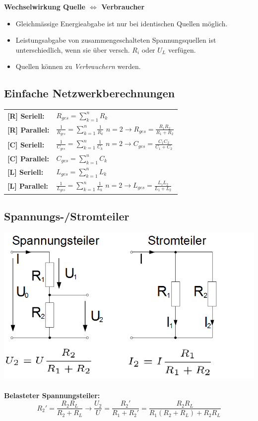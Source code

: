 \documentclass[a4paper, 11pt]{scrartcl}
\begin{document}
\begin{multicols*}{2}
				\textbf{Wechselwirkung Quelle $\Leftrightarrow$ Verbraucher}
				\begin{itemize}
					\item Gleichmässige Energieabgabe ist nur bei identischen Quellen möglich.
					\item Leistungsabgabe von zusammengeschalteten Spannungsquellen ist unterschiedlich, wenn sie über versch. $R_i$ oder $U_L$ verfügen.
					\item Quellen können zu \textit{Verbrauchern} werden.			
				\end{itemize}
				
				\subsection{Einfache Netzwerkberechnungen}
				\begin{tabular}{ll}
					\textbf{[R] Seriell:} &$R_{ges}=\sum\limits_{k=1}^{n}{R_k}$\\
					\textbf{[R] Parallel:} &$\frac{1}{R_{ges}}=\sum\limits_{k=1}^{n}{\frac{1}{R_k}}$ \quad $n=2\rightarrow R_{ges}=\frac{R_1R_2}{R_1+R_2}$\\
					\textbf{[C] Seriell:} &$\frac{1}{C_{ges}}=\sum\limits_{k=1}^{n}{\frac{1}{C_k}}$ \quad $n=2\rightarrow C_{ges}=\frac{C_1C_2}{C_1+C_2}$\\
					\textbf{[C] Parallel:} &$C_{ges}=\sum\limits_{k=1}^{n}{C_k}$\\
					\textbf{[L] Seriell:} &$L_{ges}=\sum\limits_{k=1}^{n}{L_k}$\\
					\textbf{[L] Parallel:} &$\frac{1}{L_{ges}}=\sum\limits_{k=1}^{n}{\frac{1}{L_k}}$ \quad $n=2\rightarrow L_{ges}=\frac{L_1L_2}{L_1+L_2}$				
				\end{tabular}

				\subsection{Spannungs-/Stromteiler}
				\includegraphics[scale=0.24]{source/teiler.png}\\\\
				\textbf{Belasteter Spannungsteiler:}\\
				$$R_{2}'=\frac{R_2R_L}{R_2+R_L}\rightarrow \frac{U_2}{U}=\frac{R_{2}'}{R_1+R_{2}'}=\frac{R_2R_L}{R_1(R_2+R_L)+R_2R_L}$$


\end{multicols*}
\end{document}
